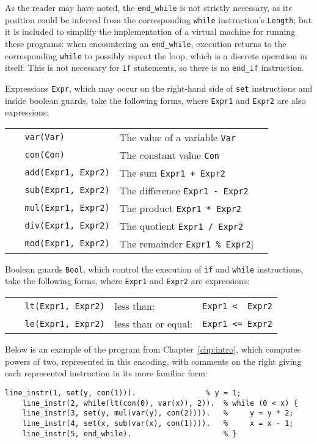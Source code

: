 \documentclass[a4paper,twoside,notitlepage]{report}
\begin{document}
As the reader may have noted, the \verb|end_while| is not strictly necessary, 
as its position could be inferred from the corresponding \verb|while| 
instruction's \verb|Length|; but it is included to simplify the implementation 
of a virtual machine for running these programs: when encountering an 
\verb|end_while|, execution returns to the corresponding \verb|while| to 
possibly repeat the loop, which is a discrete operation in itself. This is not 
necessary for \verb|if| statements, so there is no \verb|end_if| instruction.

Expressions \verb|Expr|, which may occur on the right-hand side of 
\verb|set| instructions and inside boolean guards, take the following 
forms, where \verb|Expr1| and \verb|Expr2| are also expressions:

\begin{tabular}{lll}
    \verb|   var(Var)|          & The value of a variable \verb|Var|
\\  \verb|   con(Con)|          & The constant value \verb|Con|
\\  \verb|   add(Expr1, Expr2)| & The sum \verb|Expr1 + Expr2|
\\  \verb|   sub(Expr1, Expr2)| & The difference \verb|Expr1 - Expr2|
\\  \verb|   mul(Expr1, Expr2)| & The product \verb|Expr1 * Expr2|
\\  \verb|   div(Expr1, Expr2)| & The quotient \verb|Expr1 / Expr2|
\\  \verb|   mod(Expr1, Expr2)| & The remainder \verb|Expr1 % Expr2|
\end{tabular}

Boolean guards \verb|Bool|, which control the execution of \verb|if| and 
\verb|while| instructions, take the following forms, where \verb|Expr1| 
and \verb|Expr2| are expressions:

\begin{tabular}{lll}
    \verb|   lt(Expr1, Expr2)| & less than:          & \verb|Expr1 <  Expr2|
\\  \verb|   le(Expr1, Expr2)| & less than or equal: & \verb|Expr1 <= Expr2|
\end{tabular}

Below is an example of the program from Chapter~\ref{chp:intro}, which 
computes powers of two, represented in this encoding, with comments on 
the right giving each represented instruction in its more familiar form:
\begin{Verbatim}[samepage=true]
    line_instr(1, set(y, con(1))).                % y = 1;
    line_instr(2, while(lt(con(0), var(x)), 2)).  % while (0 < x) {
    line_instr(3, set(y, mul(var(y), con(2)))).   %     y = y * 2;
    line_instr(4, set(x, sub(var(x), con(1)))).   %     x = x - 1;
    line_instr(5, end_while).                     % }
\end{Verbatim}
\end{document}
